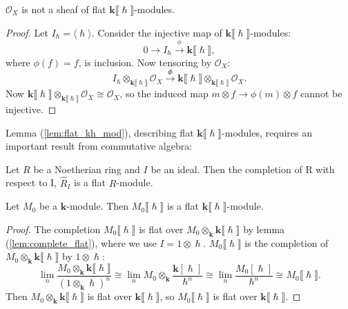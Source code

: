     \begin{lem} \( \mathcal{O}_X\) is not a sheaf of flat \( \mathbf{k}\lBrack \hslash \rBrack\)-modules.
    \end{lem}
    \begin{proof}
    Let \( I_{\hslash} = \langle \hslash \rangle \). 
    Consider the injective map of \( \mathbf{k} \lBrack \hslash \rBrack\)-modules:
    \[ 0 \rightarrow  I_{\hslash} \overset{\phi}{\rightarrow} \mathbf{k} \lBrack \hslash \rBrack,\]
    where \( \phi(f)  = f\), is inclusion. Now tensoring by \( \mathcal{O}_X\):
    \[ I_{\hslash} \otimes_{\mathbf{k}\lBrack \hslash \rBrack} \mathcal{O}_X \overset{\Phi}{\rightarrow} \mathbf{k}\lBrack \hslash \rBrack \otimes_{\mathbf{k}\lBrack \hslash \rBrack} \mathcal{O}_X. \]
    Now  \( \mathbf{k}\lBrack \hslash \rBrack \otimes_{\mathbf{k}\lBrack \hslash \rBrack} \mathcal{O}_X \cong \mathcal{O}_X\), so the induced map \( m \otimes f \rightarrow \phi(m) \otimes f \) cannot be injective.  %
    \end{proof}

    
    Lemma (\ref{lem:flat_kh_mod}), describing flat \( \mathbf{k}\lBrack\hslash\rBrack\)-modules, requires an important result from commutative algebra:
    \begin{lem} 
    \label{lem:complete_flat}
    Let \(R\) be a Noetherian ring and \(I\) be an ideal. Then the completion of R with respect to I, \(\widehat{R}_I\) is a flat \(R\)-module.
    \end{lem}



    \begin{lem}
    \label{lem:flat_kh_mod}
    Let \(M_0\) be a \(\mathbf{k}\)-module. Then \( M_0 \lBrack \hslash \rBrack\) is a flat \( \mathbf{k}\lBrack \hslash\rBrack\)-module.
    \end{lem}

    \begin{proof}
    The completion \(M_0 \lBrack \hslash \rBrack\) is flat over \(M_0 \otimes_{\mathbf{k}} \mathbf{k}\lBrack \hslash \rBrack \) by lemma (\ref{lem:complete_flat}), where we use \(I = 1 \otimes \hslash\).  \(M_0 \lBrack \hslash\rBrack\) is the completion of \(M_0 \otimes_{\mathbf{k}} \mathbf{k}\lBrack \hslash \rBrack\) by \( 1 \otimes \hslash\): 
    \[ \lim_n \frac{M_0  \otimes_{\mathbf{k}} \mathbf{k}\lBrack \hslash \rBrack }{\left(1 \otimes_{\mathbf{k}} \hslash\right)^n} \cong \lim_n M_0 \otimes_{\mathbf{k}}  \frac{\mathbf{k}[\hslash]}{\hslash^n} \cong \lim_n \frac{M_0[\hslash]}{\hslash^n} \cong M_0 \lBrack\hslash\rBrack.\] 
    Then \(M_0 \otimes_{\mathbf{k}} \mathbf{k} \lBrack \hslash \rBrack \) is flat over \( \mathbf{k} \lBrack \hslash\rBrack\), so \(M_0 \lBrack \hslash \rBrack\) is flat over \( \mathbf{k} \lBrack \hslash \rBrack\).
    \end{proof}
    
